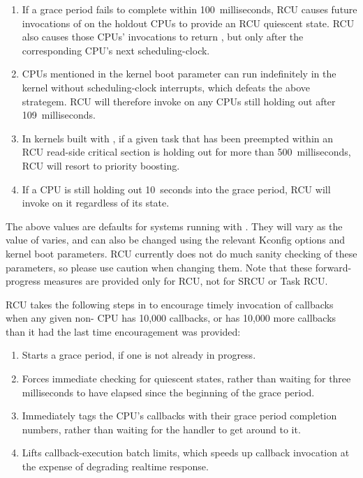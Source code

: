 \begin{enumerate}
\item If a grace period fails to complete within 100 milliseconds, RCU
   causes future invocations of  on the holdout CPUs
   to provide an RCU quiescent state.
   RCU also causes those CPUs'
    invocations to return , but only after the
   corresponding CPU's next scheduling-clock.
\item CPUs mentioned in the  kernel boot parameter can run
   indefinitely in the kernel without scheduling-clock interrupts, which
   defeats the above  strategem.
   RCU will therefore
   invoke  on any  CPUs still holding out
   after 109 milliseconds.
\item In kernels built with , if a given task that
   has been preempted within an RCU read-side critical section is
   holding out for more than 500 milliseconds, RCU will resort to
   priority boosting.
\item If a CPU is still holding out 10 seconds into the grace period, RCU
   will invoke  on it regardless of its 
   state.
\end{enumerate}

The above values are defaults for systems running with .
They
will vary as the value of  varies, and can also be changed using
the relevant Kconfig options and kernel boot parameters.
RCU currently
does not do much sanity checking of these parameters, so please use
caution when changing them.
Note that these forward-progress measures
are provided only for RCU, not for SRCU %
or Task RCU\@. %

RCU takes the following steps in  to encourage timely
invocation of callbacks when any given non- CPU has
10,000 callbacks, or has 10,000 more callbacks than it had the last time
encouragement was provided:

\begin{enumerate}
\item Starts a grace period, if one is not already in progress.
\item Forces immediate checking for quiescent states, rather than waiting
   for three milliseconds to have elapsed since the beginning of the
   grace period.
\item Immediately tags the CPU's callbacks with their grace period
   completion numbers, rather than waiting for the 
   handler to get around to it.
\item Lifts callback-execution batch limits, which speeds up callback
   invocation at the expense of degrading realtime response.
\end{enumerate}

